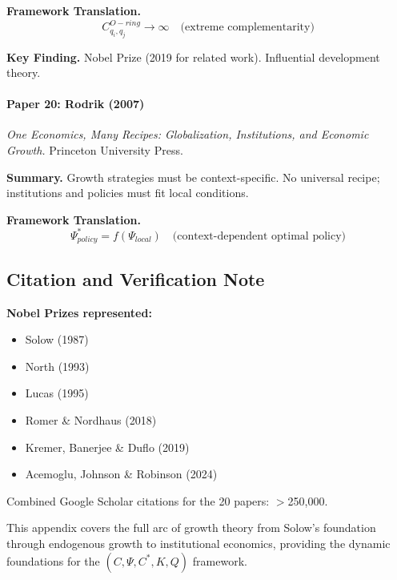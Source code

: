 \textbf{Framework Translation.}
\begin{equation}
C_{q_i, q_j}^{O-ring} \to \infty \quad \text{(extreme complementarity)}
\end{equation}

\textbf{Key Finding.}
Nobel Prize (2019 for related work). Influential development theory.

\paragraph{Paper 20: Rodrik (2007)}

\textit{One Economics, Many Recipes: Globalization, Institutions, and Economic Growth.}
Princeton University Press.

\textbf{Summary.}
Growth strategies must be context-specific. No universal recipe; 
institutions and policies must fit local conditions.

\textbf{Framework Translation.}
\begin{equation}
\Psi^*_{policy} = f(\Psi_{local}) \quad \text{(context-dependent optimal policy)}
\end{equation}

\subsection{Citation and Verification Note}

\textbf{Nobel Prizes represented:}
\begin{itemize}
    \item Solow (1987)
    \item North (1993)
    \item Lucas (1995)
    \item Romer \& Nordhaus (2018)
    \item Kremer, Banerjee \& Duflo (2019)
    \item Acemoglu, Johnson \& Robinson (2024)
\end{itemize}

Combined Google Scholar citations for the 20 papers: $>$250,000.

This appendix covers the full arc of growth theory from Solow's foundation 
through endogenous growth to institutional economics, providing the dynamic 
foundations for the $(C, \Psi, C^*, K, Q)$ framework.


